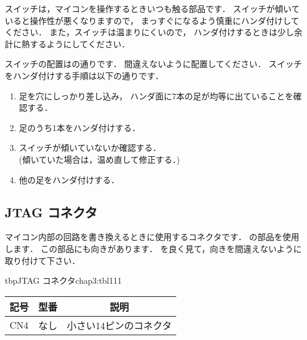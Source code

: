 

スイッチは，マイコンを操作するときいつも触る部品です．
スイッチが傾いていると操作性が悪くなりますので，
まっすぐになるよう慎重にハンダ付けしてください．
また，スイッチは温まりにくいので，
ハンダ付けするときは少し余計に熱するようにしてください．

スイッチの配置はの通りです．
間違えないように配置してください．
スイッチをハンダ付けする手順は以下の通りです．

\begin{enumerate}
\item 足を穴にしっかり差し込み，
ハンダ面に7本の足が均等に出ていることを確認する．
\item 足のうち1本をハンダ付けする．
\item スイッチが傾いていないか確認する．\\
(傾いていた場合は，温め直して修正する．)
\item 他の足をハンダ付けする．
\end{enumerate}


\subsection{JTAG コネクタ}
マイコン内部の回路を書き換えるときに使用するコネクタです．
の部品を使用します．
この部品にも向きがあります．
を良く見て，向きを間違えないように取り付けて下さい．

\begin{mytable}{tbp}{JTAG コネクタ}{chap3:tbl111}
{\small\begin{tabular}{l|l|l}
\hline
\hline
\multicolumn{1}{c|}{記号} &
\multicolumn{1}{c|}{型番} &
\multicolumn{1}{c}{説明} \\
\hline
CN4 & なし & 小さい14ピンのコネクタ \\
\end{tabular}}
\end{mytable}


